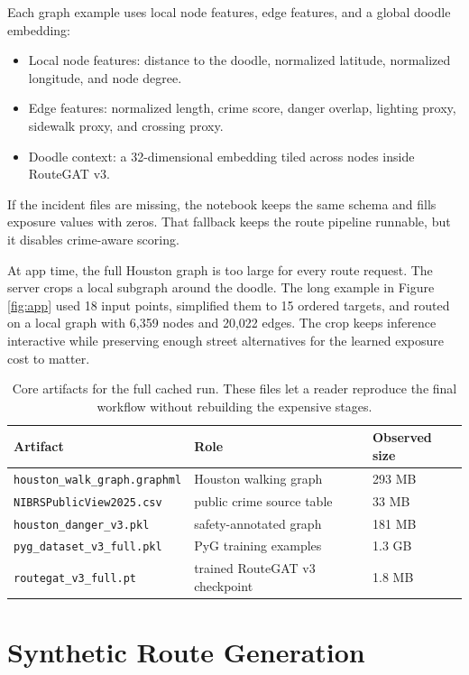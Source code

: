 \documentclass{article}
\begin{document}
Each graph example uses local node features, edge features, and a global doodle embedding:
\begin{itemize}
  \item Local node features: distance to the doodle, normalized latitude, normalized longitude, and node degree.
  \item Edge features: normalized length, crime score, danger overlap, lighting proxy, sidewalk proxy, and crossing proxy.
  \item Doodle context: a 32-dimensional embedding tiled across nodes inside RouteGAT v3.
\end{itemize}
If the incident files are missing, the notebook keeps the same schema and fills exposure values with zeros. That fallback keeps the route pipeline runnable, but it disables crime-aware scoring.

At app time, the full Houston graph is too large for every route request. The server crops a local subgraph around the doodle. The long example in Figure \ref{fig:app} used 18 input points, simplified them to 15 ordered targets, and routed on a local graph with 6,359 nodes and 20,022 edges. The crop keeps inference interactive while preserving enough street alternatives for the learned exposure cost to matter.

\begin{table}[t]
  \centering
  \caption{Core artifacts for the full cached run. These files let a reader reproduce the final workflow without rebuilding the expensive stages.}
  \label{tab:artifacts}
  \small
  \begin{tabular}{lll}
    \toprule
    Artifact & Role & Observed size \\
    \midrule
    \texttt{houston\_walk\_graph.graphml} & Houston walking graph & 293 MB \\
    \texttt{NIBRSPublicView2025.csv} & public crime source table & 33 MB \\
    \texttt{houston\_danger\_v3.pkl} & safety-annotated graph & 181 MB \\
    \texttt{pyg\_dataset\_v3\_full.pkl} & PyG training examples & 1.3 GB \\
    \texttt{routegat\_v3\_full.pt} & trained RouteGAT v3 checkpoint & 1.8 MB \\
    \bottomrule
  \end{tabular}
\end{table}

\section{Synthetic Route Generation}
\end{document}

